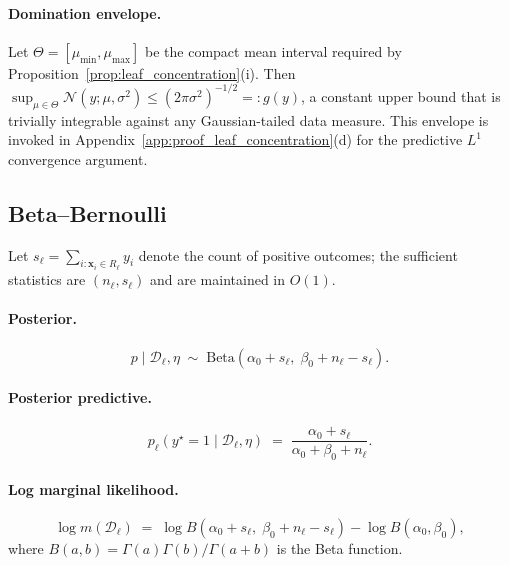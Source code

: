 \documentclass[twoside,11pt]{article}
\begin{document}
\paragraph{Domination envelope.}
Let $\Theta = [\mu_{\min}, \mu_{\max}]$ be the compact mean interval required by Proposition~\ref{prop:leaf_concentration}(i). Then $\sup_{\mu\in\Theta} \mathcal{N}(y;\mu,\sigma^2) \le (2\pi\sigma^2)^{-1/2} =: g(y)$, a constant upper bound that is trivially integrable against any Gaussian-tailed data measure. This envelope is invoked in Appendix~\ref{app:proof_leaf_concentration}(d) for the predictive $L^1$ convergence argument.


\subsection{Beta--Bernoulli}\label{app:conjugate_beta}

Let $s_\ell = \sum_{i:\mathbf{x}_i\in R_\ell} y_i$ denote the count of positive outcomes; the sufficient statistics are $(n_\ell, s_\ell)$ and are maintained in $O(1)$.

\paragraph{Posterior.}
\begin{equation}\label{eq:beta_posterior}
p \mid \mathcal{D}_\ell,\eta \;\sim\; \mathrm{Beta}\!\left(\alpha_0 + s_\ell,\; \beta_0 + n_\ell - s_\ell\right).
\end{equation}

\paragraph{Posterior predictive.}
\begin{equation}\label{eq:beta_predictive}
p_\ell(y^\star = 1 \mid \mathcal{D}_\ell,\eta) \;=\; \frac{\alpha_0 + s_\ell}{\alpha_0 + \beta_0 + n_\ell}.
\end{equation}

\paragraph{Log marginal likelihood.}
\begin{equation}\label{eq:beta_log_marginal}
\log m(\mathcal{D}_\ell)
\;=\; \log B\!\left(\alpha_0 + s_\ell,\; \beta_0 + n_\ell - s_\ell\right) - \log B(\alpha_0, \beta_0),
\end{equation}
where $B(a,b) = \Gamma(a)\Gamma(b)/\Gamma(a+b)$ is the Beta function.
\end{document}
